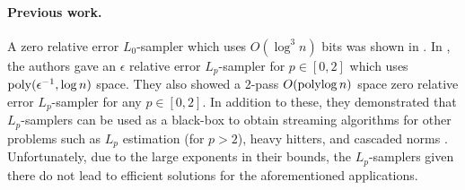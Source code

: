 \paragraph{Previous work.} 
A zero relative error $L_0$-sampler which uses $O(\log^3 n)$ bits was shown in \cite{FrahlingIS05}. In \cite{MonemizadehW10}, the authors gave an $\epsilon$ relative error
$L_p$-sampler for $p \in [0,2]$ which uses $\operatorname{poly}(\epsilon^{-1},\log n)$ space. They also showed 
  a 2-pass $O(\operatorname{polylog} n)$ space zero relative error $L_p$-sampler for any $p\in [0,2]$. In addition
  to these, they demonstrated that $L_p$-samplers can be used as a black-box to obtain
   streaming algorithms for other problems such as $L_p$ estimation (for $p >2$), heavy hitters, 
   and cascaded norms \cite{JayramW09}.
   Unfortunately, due to the large exponents in their bounds, the
  $L_p$-samplers given there do not lead to efficient solutions for the aforementioned applications.
  
